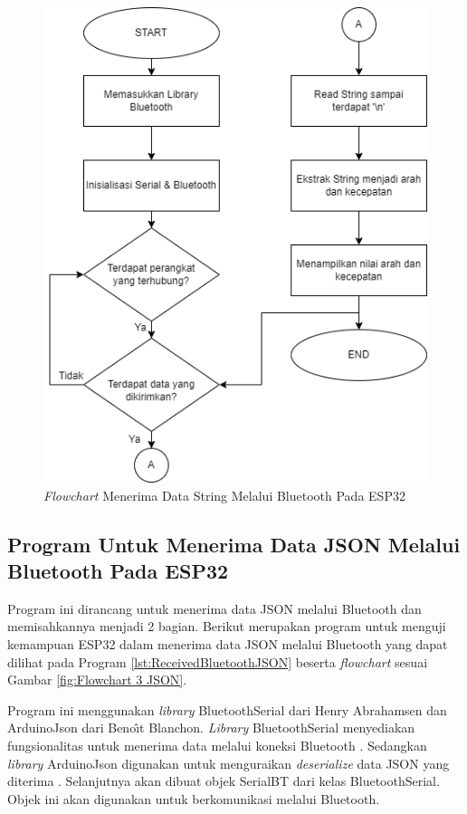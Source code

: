 \begin{figure} [ht] \centering
  \includegraphics[scale=0.7]{gambar/program/2. Data String Bluetooth.png}
  \caption{\emph{Flowchart} Menerima Data String Melalui Bluetooth Pada ESP32}
  \label{fig:Flowchart 2 String}
\end{figure}

\subsection{Program Untuk Menerima Data JSON Melalui Bluetooth Pada ESP32}

Program ini dirancang untuk menerima data JSON melalui Bluetooth dan memisahkannya menjadi 2 bagian. Berikut merupakan program untuk menguji kemampuan ESP32 dalam menerima data JSON melalui Bluetooth yang dapat dilihat pada Program \ref{lst:ReceivedBluetoothJSON} beserta \emph{flowchart} sesuai Gambar \ref{fig:Flowchart 3 JSON}. 

Program ini menggunakan \emph{library} BluetoothSerial dari Henry Abrahamsen dan ArduinoJson dari Beno\^{\i}t Blanchon. \emph{Library} BluetoothSerial menyediakan fungsionalitas untuk menerima data melalui koneksi Bluetooth \parencite{Abrahamsen_2023}. Sedangkan \emph{library} ArduinoJson digunakan untuk menguraikan \emph{deserialize} data JSON yang diterima \parencite{blanchon2021mastering}. Selanjutnya akan dibuat objek SerialBT dari kelas BluetoothSerial. Objek ini akan digunakan untuk berkomunikasi melalui Bluetooth.

